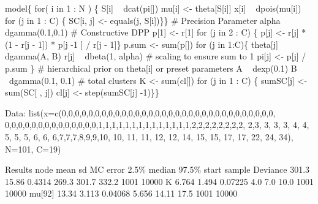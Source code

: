 model\{	
  for( i in 1 : N ) \{
    S[i] ~ dcat(pi[])
    mu[i] <- theta[S[i]]
    x[i] ~ dpois(mu[i])	
    for (j in 1 : C) \{
      SC[i, j] <- equals(j, S[i])\}\}
    # Precision Parameter 		
    alpha~ dgamma(0.1,0.1)
    # Constructive DPP
    p[1] <- r[1]
    for (j in 2 : C) \{
      p[j] <- r[j] * (1 - r[j - 1]) * p[j -1 ] / r[j - 1]\}
    p.sum <- sum(p[])		
    for (j in 1:C)\{     
      theta[j] ~ dgamma(A, B)
      r[j] ~ dbeta(1, alpha)			
      # scaling to ensure sum to 1 
      pi[j] <- p[j] / p.sum \}
    # hierarchical prior on theta[i] or preset parameters
    A ~ dexp(0.1)     B ~dgamma(0.1, 0.1)
    # total clusters			
    K <- sum(cl[])
    for (j in 1 : C) \{
      sumSC[j] <- sum(SC[ , j])
      cl[j] <- step(sumSC[j] -1)\}\}

Data:
list(x=c(0,0,0,0,0,0,0,0,0,0,0,0,0,0,0,0,0,0,0,0,0,0,0,0,0,0,0,0,0,0,0,0,
0,0,0,0,0,0,0,0,0,0,0,0,0,0,1,1,1,1,1,1,1,1,1,1,1,1,1,1,2,2,2,2,2,2,2,2,
2,3, 3, 3, 3, 4, 4, 5, 5, 5, 6, 6, 6,7,7,7,8,9,9,10, 10,
11, 11, 12,  12,  14,  15,  15,  17,  17,  22,  24,  34), N=101, C=19)

Results
node        mean   sd      MC error 2.5\%   median  97.5\%  start   sample
Deviance    301.3  15.86   0.4314   269.3   301.7   332.2   1001    10000
K           6.764  1.494   0.07225  4.0	7.0 10.0    1001    10000
mu[92]      13.34  3.113   0.04068  5.656   14.11   17.5    1001    10000